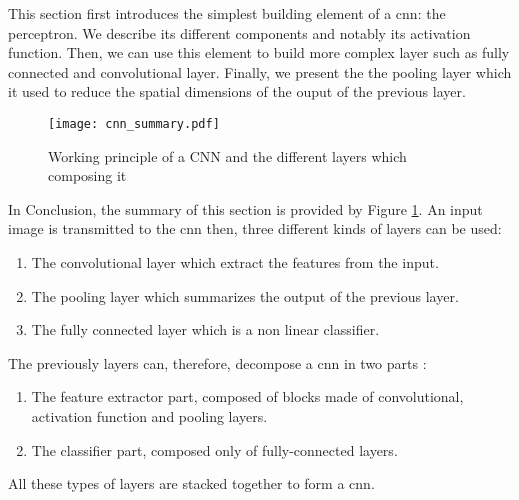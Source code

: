 This section first introduces the simplest building element of a \acrshort{cnn}: the perceptron. We describe its different components and notably its activation function. Then, we can use this element to build more complex layer such as fully connected and convolutional layer. Finally, we present the the pooling layer which it used to reduce the spatial dimensions of the ouput of the previous layer.
%
%

%

%

%

%

%


\begin{figure}
    \centering
    \texttt{[image: cnn\_summary.pdf]}
    \caption{Working principle of a CNN and the different layers which composing it}
    \label{fig:layer:summary}
\end{figure}
%
In Conclusion, the summary of this section is provided by Figure \ref{fig:layer:summary}. An input image is transmitted to the \acrshort{cnn} then, three different kinds of layers can be used:
%
\begin{enumerate}
    \item The convolutional layer which extract the features from the input.
    \item The pooling layer which summarizes the output of the previous layer.
    \item The fully connected layer which is a non linear classifier.
\end{enumerate}
%
The previously layers can, therefore, decompose a \acrshort{cnn} in two parts \cite{matteucci_artificial_2019}:
\begin{enumerate}
    \item The feature extractor part, composed of blocks made of convolutional, activation function and pooling layers.
    \item The classifier part, composed only of fully-connected layers.
\end{enumerate}
%
All these types of layers are stacked together to form a \acrshort{cnn}.
%

